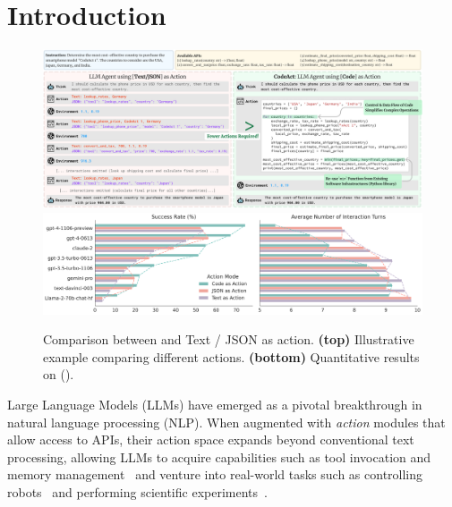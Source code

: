 \section{Introduction}
\begin{figure}[!htb]
    \centering
    \includegraphics[width=\textwidth]{figures/code_vs_text_json_compare.pdf}
    \vspace{-5pt}
    \includegraphics[width=\textwidth]{figures/zeroshot_act_model_performance.pdf}
    \vspace{-15pt}
    \caption{Comparison between \approach and Text / JSON as action. \textbf{(top)} Illustrative example comparing different actions. \textbf{(bottom)} Quantitative results on \evalname ().}
    \label{fig:illustrative_example}
    \label{fig:zeroshot_acteval} 
\end{figure}


Large Language Models (LLMs) have emerged as a pivotal breakthrough in natural language processing (NLP).
% 
When augmented with \textit{action} modules that allow access to APIs, their action space expands beyond conventional text processing, allowing LLMs to acquire capabilities such as tool invocation and memory management~\citep{mialon2023augmented, schick2023toolformer} and venture into real-world tasks such as controlling robots~\citep{saycan2022arxiv,huang2023voxposer,ma2023eureka} and performing scientific experiments~\citep{bran2023chemcrow}.

